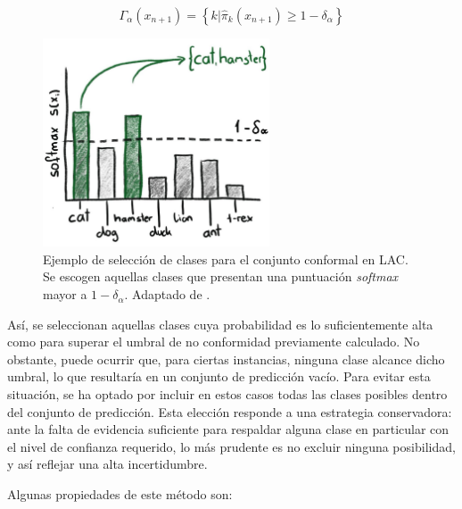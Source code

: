 $$
\Gamma_\alpha(x_{n+1}) = \left\{ k | \hat{\pi}_k(x_{n+1}) \ge 1-\delta_\alpha \right\} 
$$

\begin{figure}[h]
    \centering
    \includegraphics[width=0.6\textwidth]{capitulos/cap_04/imagenes/LAC_threshold.jpg}
    \caption[
        Ejemplo de selección de clases para el conjunto conformal en LAC. 
    ]{
        Ejemplo de selección de clases para el conjunto conformal en \acrshort{LAC}. Se escogen aquellas clases que presentan una puntuación \textit{softmax} mayor a $1-\delta_\alpha$. Adaptado de \cite{mindfulmodeler2023week1}.
    }
    \label{fig:LAC_threshold}
\end{figure}

Así, se seleccionan aquellas clases cuya probabilidad es lo suficientemente alta como para superar el umbral de no conformidad previamente calculado. No obstante, puede ocurrir que, para ciertas instancias, ninguna clase alcance dicho umbral, lo que resultaría en un conjunto de predicción vacío. Para evitar esta situación, se ha optado por incluir en estos casos todas las clases posibles dentro del conjunto de predicción. Esta elección responde a una estrategia conservadora: ante la falta de evidencia suficiente para respaldar alguna clase en particular con el nivel de confianza requerido, lo más prudente es no excluir ninguna posibilidad, y así reflejar una alta incertidumbre. 

Algunas propiedades de este método son:

